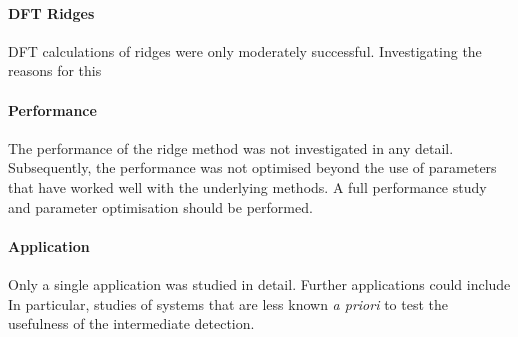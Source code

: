 \paragraph{DFT Ridges}
DFT calculations of ridges were only moderately successful.
Investigating the reasons for this \expand {}

\paragraph{Performance}
The performance of the ridge method was not investigated in any detail.
Subsequently, the performance was not optimised beyond the use of parameters that have worked well with the underlying methods.
A full performance study and parameter optimisation should be performed.

\paragraph{Application}
Only a single application was studied in detail.
Further applications could include \expand 
In particular, studies of systems that are less known \textit{a priori} to test the usefulness of the intermediate  detection.

